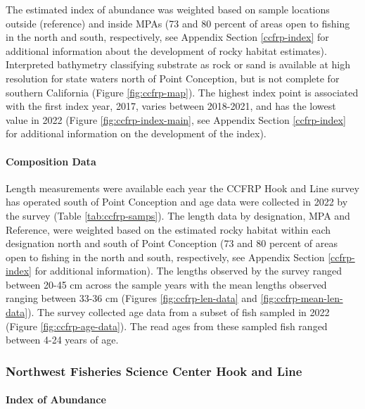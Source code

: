 \documentclass[11pt,
  english,
  letterpaper,
]{article}
\begin{document}
The estimated index of abundance was weighted based on sample locations outside (reference) and inside MPAs (73 and 80 percent of areas open to fishing in the north and south, respectively, see Appendix Section \ref{ccfrp-index} for additional information about the development of rocky habitat estimates). Interpreted bathymetry classifying substrate as rock or sand is available at high resolution for state waters north of Point Conception, but is not complete for southern California (Figure \ref{fig:ccfrp-map}). The highest index point is associated with the first index year, 2017, varies between 2018-2021, and has the lowest value in 2022 (Figure \ref{fig:ccfrp-index-main}, see Appendix Section \ref{ccfrp-index} for additional information on the development of the index).

\hypertarget{composition-data-2}{%
\paragraph{Composition Data}\label{composition-data-2}}

\hfill\break

Length measurements were available each year the CCFRP Hook and Line survey has operated south of Point Conception and age data were collected in 2022 by the survey (Table \ref{tab:ccfrp-samps}). The length data by designation, MPA and Reference, were weighted based on the estimated rocky habitat within each designation north and south of Point Conception (73 and 80 percent of areas open to fishing in the north and south, respectively, see Appendix Section \ref{ccfrp-index} for additional information). The lengths observed by the survey ranged between 20-45 cm across the sample years with the mean lengths observed ranging between 33-36 cm (Figures \ref{fig:ccfrp-len-data} and \ref{fig:ccfrp-mean-len-data}). The survey collected age data from a subset of fish sampled in 2022 (Figure \ref{fig:ccfrp-age-data}). The read ages from these sampled fish ranged between 4-24 years of age.

\hypertarget{northwest-fisheries-science-center-hook-and-line}{%
\subsubsection{Northwest Fisheries Science Center Hook and Line}\label{northwest-fisheries-science-center-hook-and-line}}

\hypertarget{index-of-abundance-1}{%
\paragraph{Index of Abundance}\label{index-of-abundance-1}}
\end{document}
